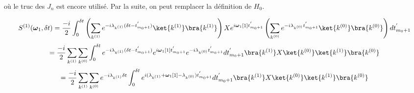 où le truc des $J_n$ est encore utilisé. Par la suite, on peut remplacer la définition de $H_0$.

\begin{equation*}
    S^{(1)}(\boldsymbol{\omega}_1, \delta t) = \frac{-i}{2}\int_{0}^{\delta t}\left(\sum_{k^{(1)}}e^{-i\lambda_{k^{(1)}}(\delta t - t^{'}_{m_0 + 1})} \ket{k^{(1)}}\bra{k^{(1)}}\right)Xe^{i\boldsymbol{\omega}_1[1]t^{'}_{m_0+1}}\left(\sum_{k^{(0)}}e^{-i\lambda_{k^{(0)}} t^{'}_{m_0 + 1}} \ket{k^{(0)}}\bra{k^{(0)}}\right)dt^{'}_{m_0 + 1}
\end{equation*}
\begin{equation*}
    = \frac{-i}{2}\sum_{k^{(1)}}\sum_{k^{(0)}}\int_{0}^{\delta t}e^{-i\lambda_{k^{(1)}}(\delta t - t^{'}_{m_0 + 1})} e^{i\boldsymbol{\omega}_1[1]t^{'}_{m_0+1}}e^{-i\lambda_{k^{(0)}} t^{'}_{m_0 + 1}}dt^{'}_{m_0 + 1} \bra{k^{(1)}}X \ket{k^{(0)}}\ket{k^{(1)}}\bra{k^{(0)}}
\end{equation*}
\begin{equation*}
    = \frac{-i}{2}\sum_{k^{(1)}}\sum_{k^{(0)}}e^{-i\lambda_{k^{(1)}}\delta t}\int_{0}^{\delta t}e^{i(\lambda_{k^{(1)}} + \boldsymbol{\omega}_1[1] - \lambda_{k^{(0)}})t^{'}_{m_0 + 1}}dt^{'}_{m_0 + 1} \bra{k^{(1)}}X \ket{k^{(0)}}\ket{k^{(1)}}\bra{k^{(0)}}
\end{equation*}





